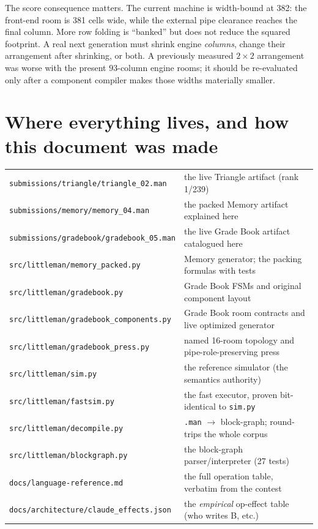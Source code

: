 \documentclass[11pt,a4paper]{article}
\begin{document}
The score consequence matters. The current machine is width-bound at 382:
the front-end room is 381 cells wide, while the external pipe clearance
reaches the final column. More row folding is ``banked'' but does not reduce the squared
footprint. A real next generation must shrink engine \emph{columns}, change
their arrangement after shrinking, or both. A previously measured $2\times2$
arrangement was worse with the present $93$-column engine rooms; it should be
re-evaluated only after a component compiler makes those widths materially
smaller.

\section{Where everything lives, and how this document was made}

\begin{center}
\small
\begin{tabular}{ll}
\texttt{submissions/triangle/triangle\_02.man} & the live Triangle artifact (rank 1/239)\\
\texttt{submissions/memory/memory\_04.man} & the packed Memory artifact explained here\\
\texttt{submissions/gradebook/gradebook\_05.man} & the live Grade Book artifact catalogued here\\
\texttt{src/littleman/memory\_packed.py} & Memory generator; the packing formulas with tests\\
\texttt{src/littleman/gradebook.py} & Grade Book FSMs and original component layout\\
\texttt{src/littleman/gradebook\_components.py} & Grade Book room contracts and live optimized generator\\
\texttt{src/littleman/gradebook\_press.py} & named 16-room topology and pipe-role-preserving press\\
\texttt{src/littleman/sim.py} & the reference simulator (the semantics authority)\\
\texttt{src/littleman/fastsim.py} & the fast executor, proven bit-identical to \texttt{sim.py}\\
\texttt{src/littleman/decompile.py} & \texttt{.man} $\to$ block-graph; round-trips the whole corpus\\
\texttt{src/littleman/blockgraph.py} & the block-graph parser/interpreter (27 tests)\\
\texttt{docs/language-reference.md} & the full operation table, verbatim from the contest\\
\texttt{docs/architecture/claude\_effects.json} & the \emph{empirical} op-effect table (who writes B, etc.)\\
\end{tabular}
\end{center}
\end{document}
